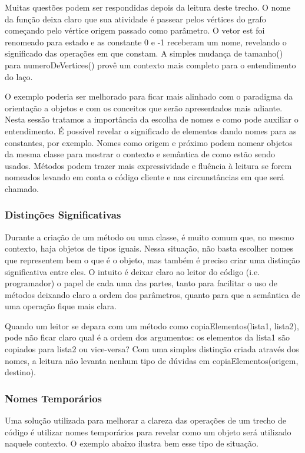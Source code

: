 Muitas questões podem ser respondidas depois da leitura deste trecho. O nome da função deixa claro que sua atividade é passear pelos vértices do grafo começando pelo vértice origem passado como parâmetro. O vetor est foi renomeado para estado e as constante 0 e -1 receberam um nome, revelando o significado das operações em que constam. A simples mudança de tamanho() para numeroDeVertices() provê um contexto mais completo para o entendimento do laço.
	
O exemplo poderia ser melhorado para ficar mais alinhado com o paradigma da orientação a objetos e com os conceitos que serão apresentados mais adiante. Nesta sessão tratamos a importância da escolha de nomes e como pode auxiliar o entendimento. É possível revelar o significado de elementos dando nomes para as constantes, por exemplo. Nomes como origem e próximo podem nomear objetos da mesma classe para mostrar o contexto e semântica de como estão sendo usados. Métodos podem trazer mais expressividade e fluência à leitura se forem nomeados levando em conta o código cliente e nas circunstâncias em que será chamado.

\subsubsection{Distinções Significativas}
Durante a criação de um método ou uma classe, é muito comum que, no mesmo contexto, haja  objetos de tipos iguais. Nessa situação, não basta escolher nomes que representem bem o que é o objeto, mas também é preciso criar uma distinção significativa entre eles. O intuito é deixar claro ao leitor do código  (i.e. programador) o papel de cada uma das partes, tanto para facilitar o uso de métodos deixando claro a ordem dos parâmetros, quanto para que a semântica de uma operação fique mais clara.
	
Quando um leitor se depara com um método como copiaElementos(lista1, lista2), pode não ficar claro qual é a ordem dos argumentos: os elementos da lista1 são copiados para lista2 ou vice-versa? Com uma simples distinção criada através dos nomes, a leitura não levanta nenhum tipo de dúvidas em copiaElementos(origem, destino).

\subsubsection{Nomes Temporários}
Uma solução utilizada para melhorar a clareza das operações de um trecho de código é utilizar nomes temporários para revelar como um objeto será utilizado naquele contexto. O exemplo abaixo ilustra bem esse tipo de situação.

